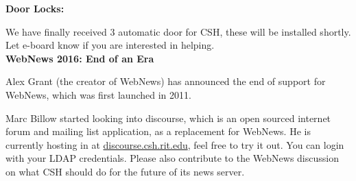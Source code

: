 \documentclass[9pt]{extarticle}
\begin{document}
\begin{minipage}[t]{.35\linewidth}
\begin{mdframed}[style=sidebar,frametitle={}]
\textbf{Door Locks:}

We have finally received 3 automatic door for CSH, these will be installed shortly. Let e-board know if you are interested in helping. \\

\textbf{WebNews 2016: End of an Era} 

Alex Grant (the creator of WebNews) has announced the end of support for WebNews, which was first launched in 2011. 

Marc Billow started looking into discourse, which is an open sourced internet forum and mailing list application, as a replacement for WebNews. He is currently hosting in at \href{http://discourse.csh.rit.edu}{discourse.csh.rit.edu}, feel free to try it out. You can login with your LDAP credentials. Please also contribute to the WebNews discussion on what CSH should do for the future of its news server.




\end{mdframed}
\end{minipage}\hfill %
%
%
\end{document}
